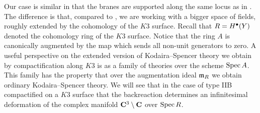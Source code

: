 \documentclass[../main.tex]{subfiles}
\begin{document}
Our case is similar in that the branes are supported along the same locus as in \cite{CostelloGaiotto, CP}.
The difference is that, compared to \cite{CostelloGaiotto}, we are working with a bigger space of fields, roughly extended by the cohomology of the $K3$ surface.
Recall that $R = H^{\bullet}(Y)$ denoted the cohomology ring of the $K3$ surface.
Notice that the ring $A$ is canonically augmented by the map which sends all non-unit generators to zero. %
A useful perspective on the extended version of Kodaira--Spencer theory we obtain by compactification along $K3$ is as a family of theories over the scheme $\operatorname{Spec} A$.
This family has the property that over the augmentation ideal $\mathfrak{m}_R$ we obtain ordinary Kodaira--Spencer theory.
We will see that in the case of type IIB compactified on a $K3$ surface that the backreaction determines an infinitesimal deformation of the complex manifold $\mathbf{C}^3 \setminus \mathbf{C}$ over $\operatorname{Spec} R$. 
 
\end{document}
